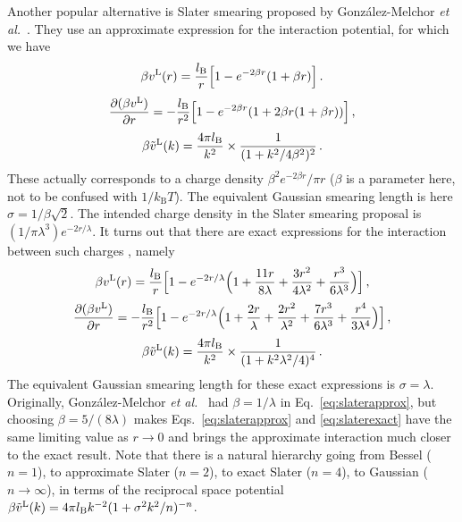 \documentclass[12pt,a4paper]{article}
\newcommand{\latin}[1]{\emph{#1}}
\newcommand{\etal}{\latin{et al.}}
\newcommand{\kB}{k_{\mathrm{B}}}
\newcommand{\kT}{\kB T}
\newcommand{\lr}{^{\mathrm{L}}}
\newcommand{\Eqref}[1]{Eq.~\eqref{#1}}
\newcommand{\Eqsref}[1]{Eqs.~\eqref{#1}}
\begin{document}
Another popular alternative is Slater smearing proposed by
Gonz\'alez-Melchor \etal\ \cite{GM+06}.  They use an approximate
expression for the interaction potential, for which we have
%
\begin{equation}
  \beta v\lr(r)=\frac{\lB}{r}\Bigl[1-e^{-2\beta r}(1+\beta r)\Bigr]\,.
  \label{eq:slaterapprox}
\end{equation}
%
\begin{equation}
  \frac{\partial(\beta v\lr)}{\partial r}=
  -\frac{\lB}{r^2}\Bigl[1-e^{-2\beta r}(1+2\beta r(1+\beta r))\Bigr]\,,
\end{equation}
%
\begin{equation}
\beta {\tilde v}\lr(k)=\frac{4\pi\lB}{k^2}\times\frac{1}{(1+k^2/4\beta^2)^2}\,.
\end{equation}
%
These actually corresponds to a charge density $\beta^2 e^{-2\beta
  r}/\pi r$ ($\beta$ is a parameter here, not to be confused with
$1/\kT$). The equivalent Gaussian smearing length is here
$\sigma=1/\beta\sqrt{2}$.  The intended charge density in the Slater
smearing proposal is $(1/\pi\lambda^3)e^{-2r/\lambda}$.  It turns out
that there are exact expressions for the interaction between such
charges \cite{WV14}, namely
%
\begin{equation}
  \beta v\lr(r)=\frac{\lB}{r}\Bigl[1-e^{-2r/\lambda}\Bigl(
    1+\frac{11r}{8\lambda}+\frac{3r^2}{4\lambda^2}
    +\frac{r^3}{6\lambda^3}\Bigr)\Bigr]\,,\label{eq:slaterexact}
\end{equation}
%
\begin{equation}
  \frac{\partial(\beta v\lr)}{\partial r}=
  -\frac{\lB}{r^2}\Bigl[1-e^{-2r/\lambda}\Bigl(
    1+\frac{2r}{\lambda}+\frac{2r^2}{\lambda^2}
    +\frac{7r^3}{6\lambda^3}+\frac{r^4}{3\lambda^4}\Bigr)\Bigr]\,,
\end{equation}
%
\begin{equation}
\beta {\tilde v}\lr(k)=\frac{4\pi\lB}{k^2}\times\frac{1}{(1+k^2\lambda^2/4)^4}\,.
\end{equation}
%
The equivalent Gaussian smearing length for these exact expressions is
$\sigma=\lambda$.  Originally, Gon\-z\'a\-lez-Melchor
\etal\ \cite{GM+06} had $\beta=1/\lambda$ in \Eqref{eq:slaterapprox},
but choosing $\beta=5/(8\lambda)$ makes \Eqsref{eq:slaterapprox} and
\eqref{eq:slaterexact} have the same limiting value as $r\to0$ and
brings the approximate interaction much closer to the exact result.
Note that there is a natural hierarchy going from Bessel ($n=1$), to
approximate Slater ($n=2$), to exact Slater ($n=4$), to Gaussian
($n\to\infty$), in terms of the reciprocal space potential
$\beta {\tilde v}\lr(k)=4\pi\lB k^{-2}(1+\sigma^2k^2/n)^{-n}$.
\end{document}
